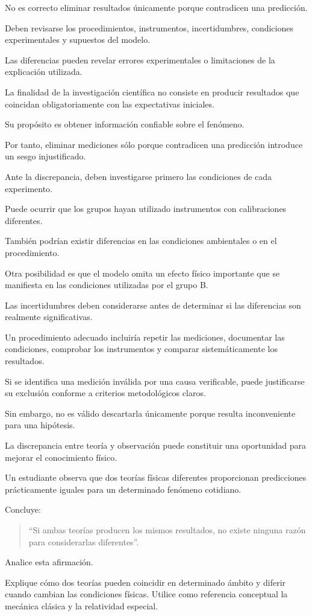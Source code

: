 \begin{respuesta}
No es correcto eliminar resultados únicamente porque contradicen una predicción.

Deben revisarse los procedimientos, instrumentos, incertidumbres, condiciones experimentales y supuestos del modelo.

Las diferencias pueden revelar errores experimentales o limitaciones de la explicación utilizada.
\end{respuesta}

\begin{explicacion}
La finalidad de la investigación científica no consiste en producir resultados que coincidan obligatoriamente con las expectativas iniciales.

Su propósito es obtener información confiable sobre el fenómeno.

Por tanto, eliminar mediciones sólo porque contradicen una predicción introduce un sesgo injustificado.

Ante la discrepancia, deben investigarse primero las condiciones de cada experimento.

Puede ocurrir que los grupos hayan utilizado instrumentos con calibraciones diferentes.

También podrían existir diferencias en las condiciones ambientales o en el procedimiento.

Otra posibilidad es que el modelo omita un efecto físico importante que se manifiesta en las condiciones utilizadas por el grupo B.

Las incertidumbres deben considerarse antes de determinar si las diferencias son realmente significativas.

Un procedimiento adecuado incluiría repetir las mediciones, documentar las condiciones, comprobar los instrumentos y comparar sistemáticamente los resultados.

Si se identifica una medición inválida por una causa verificable, puede justificarse su exclusión conforme a criterios metodológicos claros.

Sin embargo, no es válido descartarla únicamente porque resulta inconveniente para una hipótesis.

La discrepancia entre teoría y observación puede constituir una oportunidad para mejorar el conocimiento físico.
\end{explicacion}


\begin{ejercicio}
Un estudiante observa que dos teorías físicas diferentes proporcionan predicciones prácticamente iguales para un determinado fenómeno cotidiano.

Concluye:

\begin{quote}
``Si ambas teorías producen los mismos resultados, no existe ninguna razón para considerarlas diferentes''.
\end{quote}

Analice esta afirmación.

Explique cómo dos teorías pueden coincidir en determinado ámbito y diferir cuando cambian las condiciones físicas.
Utilice como referencia conceptual la mecánica clásica y la relatividad especial.
\end{ejercicio}

